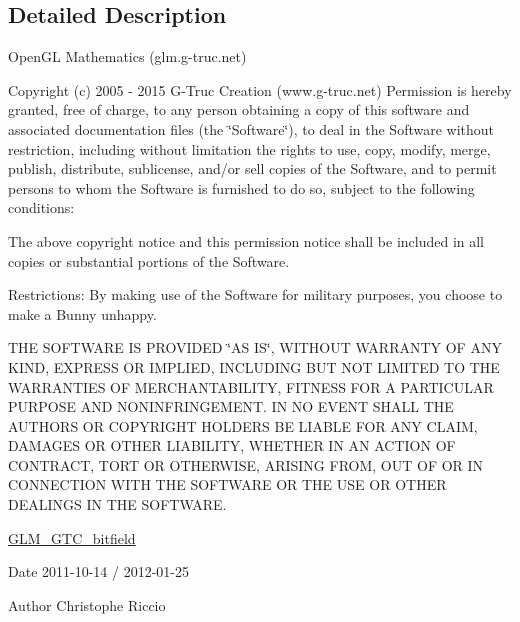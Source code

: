 \subsection{Detailed Description}
Open\-G\-L Mathematics (glm.\-g-\/truc.\-net)

Copyright (c) 2005 -\/ 2015 G-\/\-Truc Creation (www.\-g-\/truc.\-net) Permission is hereby granted, free of charge, to any person obtaining a copy of this software and associated documentation files (the \char`\"{}\-Software\char`\"{}), to deal in the Software without restriction, including without limitation the rights to use, copy, modify, merge, publish, distribute, sublicense, and/or sell copies of the Software, and to permit persons to whom the Software is furnished to do so, subject to the following conditions\-:

The above copyright notice and this permission notice shall be included in all copies or substantial portions of the Software.

Restrictions\-: By making use of the Software for military purposes, you choose to make a Bunny unhappy.

T\-H\-E S\-O\-F\-T\-W\-A\-R\-E I\-S P\-R\-O\-V\-I\-D\-E\-D \char`\"{}\-A\-S I\-S\char`\"{}, W\-I\-T\-H\-O\-U\-T W\-A\-R\-R\-A\-N\-T\-Y O\-F A\-N\-Y K\-I\-N\-D, E\-X\-P\-R\-E\-S\-S O\-R I\-M\-P\-L\-I\-E\-D, I\-N\-C\-L\-U\-D\-I\-N\-G B\-U\-T N\-O\-T L\-I\-M\-I\-T\-E\-D T\-O T\-H\-E W\-A\-R\-R\-A\-N\-T\-I\-E\-S O\-F M\-E\-R\-C\-H\-A\-N\-T\-A\-B\-I\-L\-I\-T\-Y, F\-I\-T\-N\-E\-S\-S F\-O\-R A P\-A\-R\-T\-I\-C\-U\-L\-A\-R P\-U\-R\-P\-O\-S\-E A\-N\-D N\-O\-N\-I\-N\-F\-R\-I\-N\-G\-E\-M\-E\-N\-T. I\-N N\-O E\-V\-E\-N\-T S\-H\-A\-L\-L T\-H\-E A\-U\-T\-H\-O\-R\-S O\-R C\-O\-P\-Y\-R\-I\-G\-H\-T H\-O\-L\-D\-E\-R\-S B\-E L\-I\-A\-B\-L\-E F\-O\-R A\-N\-Y C\-L\-A\-I\-M, D\-A\-M\-A\-G\-E\-S O\-R O\-T\-H\-E\-R L\-I\-A\-B\-I\-L\-I\-T\-Y, W\-H\-E\-T\-H\-E\-R I\-N A\-N A\-C\-T\-I\-O\-N O\-F C\-O\-N\-T\-R\-A\-C\-T, T\-O\-R\-T O\-R O\-T\-H\-E\-R\-W\-I\-S\-E, A\-R\-I\-S\-I\-N\-G F\-R\-O\-M, O\-U\-T O\-F O\-R I\-N C\-O\-N\-N\-E\-C\-T\-I\-O\-N W\-I\-T\-H T\-H\-E S\-O\-F\-T\-W\-A\-R\-E O\-R T\-H\-E U\-S\-E O\-R O\-T\-H\-E\-R D\-E\-A\-L\-I\-N\-G\-S I\-N T\-H\-E S\-O\-F\-T\-W\-A\-R\-E.

\hyperlink{group__gtc__bitfield}{G\-L\-M\-\_\-\-G\-T\-C\-\_\-bitfield}

\begin{DoxyDate}{Date}
2011-\/10-\/14 / 2012-\/01-\/25 
\end{DoxyDate}
\begin{DoxyAuthor}{Author}
Christophe Riccio 
\end{DoxyAuthor}
